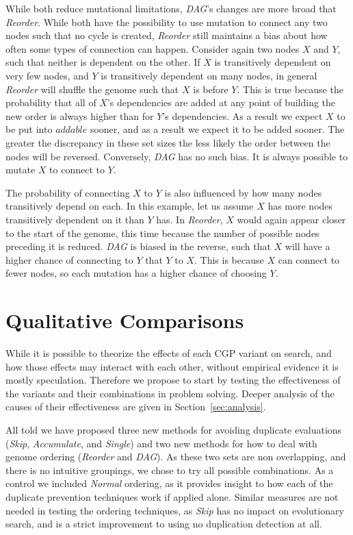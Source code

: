 \documentclass[journal]{IEEEtran}
\begin{document}
While both reduce mutational limitations, \emph{DAG}'s changes are more broad that
\emph{Reorder}.  While both have the possibility to use mutation to connect any two
nodes such that no cycle is created, \emph{Reorder} still maintains a bias about
how often some types of connection can happen.  Consider again two nodes $X$ and $Y$,
such that neither is dependent on the other.  If $X$ is transitively dependent on very
few nodes, and $Y$ is transitively dependent on many nodes, in general \emph{Reorder}
will shuffle the genome such that $X$ is before $Y$.  This is true because the probability
that all of $X$'s dependencies are added at any point of building the new order is always
higher than for $Y$'s dependencies.  As a result we expect $X$ to be put into $addable$ sooner,
and as a result we expect it to be added sooner.  The greater the discrepancy in these
set sizes the less likely the order between the nodes will be reversed.
Conversely, \emph{DAG} has no such bias.  It is always possible to mutate $X$ to connect to $Y$.

The probability of connecting $X$ to $Y$ is also influenced by how many nodes transitively depend on each.
In this example, let us assume $X$ has more nodes transitively dependent on it than $Y$ has.
In \emph{Reorder}, $X$ would again appear closer to the start of the genome, this time because the number
of possible nodes preceding it is reduced.  \emph{DAG} is biased in the reverse, such that $X$ will
have a higher chance of connecting to $Y$ that $Y$ to $X$.  This is because $X$ can connect to fewer
nodes, so each mutation has a higher chance of choosing $Y$.

\section{Qualitative Comparisons}
While it is possible to theorize the effects of each CGP variant on search, and
how those effects may interact with each other, without empirical evidence it is
mostly speculation.  Therefore we propose to start by testing the effectiveness
of the variants and their combinations in problem solving.  Deeper analysis of
the causes of their effectiveness are given in Section~\ref{sec:analysis}.

All told we have proposed three new methods for avoiding duplicate evaluations
(\emph{Skip}, \emph{Accumulate}, and \emph{Single}) and two new methods for
how to deal with genome ordering (\emph{Reorder} and \emph{DAG}).  As these two
sets are non overlapping, and there is no intuitive groupings, we chose to try
all possible combinations.  As a control we included \emph{Normal} ordering,
as it provides insight to how each of the duplicate prevention techniques work
if applied alone.  Similar measures are not needed in testing the ordering techniques,
as \emph{Skip} has no impact on evolutionary search, and is a strict improvement
to using no duplication detection at all.
\end{document}
